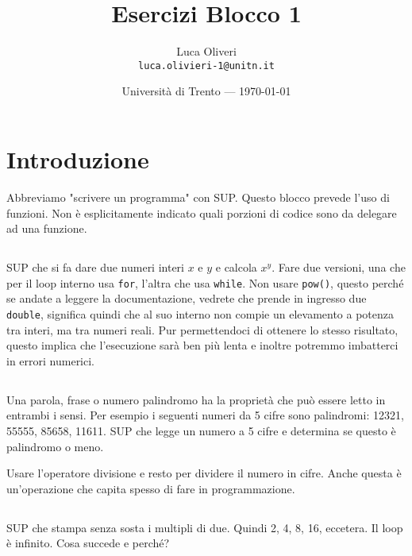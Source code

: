 \documentclass{article}
\title{Esercizi Blocco 1} %
\author{Luca Oliveri\\ \texttt{luca.olivieri-1@unitn.it}} %
\date{Università di Trento --- \today} %
\begin{document}
\maketitle %


\section*{Introduzione} %
Abbreviamo "scrivere un programma" con SUP. Questo blocco prevede l'uso di funzioni. Non è esplicitamente indicato quali porzioni di codice sono da delegare ad una funzione.


\setcounter{section}{1}


\subsection{} 
SUP che si fa dare due numeri interi $x$ e $y$ e calcola $x^y$. Fare due versioni, una che per il loop interno usa \texttt{for}, l'altra che usa \texttt{while}. Non usare \texttt{pow()}, questo perché se andate a leggere la documentazione, vedrete che prende in ingresso due \texttt{double}, significa quindi che al suo interno non compie un elevamento a potenza tra interi, ma tra numeri reali. Pur permettendoci di ottenere lo stesso risultato, questo implica che l'esecuzione sarà ben più lenta e inoltre potremmo imbatterci in errori numerici.


\subsection{}
Una parola, frase o numero palindromo ha la proprietà che può essere letto in entrambi i sensi. Per esempio i seguenti numeri da 5 cifre sono palindromi: 12321, 55555, 85658, 11611. SUP che legge un numero a 5 cifre e determina se questo è palindromo o meno.
\begin{info} 
	Usare l'operatore divisione e resto per dividere il numero in cifre. Anche questa è un'operazione che capita spesso di fare in programmazione.
\end{info}


\subsection{}
SUP che stampa senza sosta i multipli di due. Quindi 2, 4, 8, 16, eccetera. Il loop è infinito. Cosa succede e perché?
\end{document}
